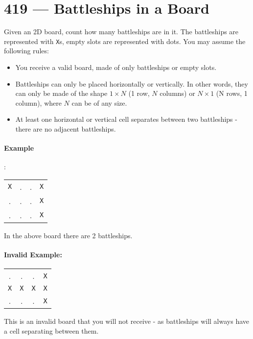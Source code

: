 \section{419 --- Battleships in a Board}
Given an 2D board, count how many battleships are in it. The battleships are represented with \texttt{X}s, empty slots are represented with dots. You may assume the following rules:

\begin{itemize}
\item You receive a valid board, made of only battleships or empty slots.
\item Battleships can only be placed horizontally or vertically. In other words, they can only be made of the shape $1\times N$ (1 row, $N$ columns) or $N\times 1$ (N rows, 1 column), where $N$ can be of any size.
\item At least one horizontal or vertical cell separates between two battleships - there are no adjacent battleships.
\end{itemize}

\paragraph{Example}:
\begin{flushleft}
\begin{table}[H]
\begin{tabular}{cccc}
\texttt{X} & . & . & \texttt{X}\\
. & . & . & \texttt{X}\\
. & . & . & \texttt{X}
\end{tabular}
\end{table}
In the above board there are 2 battleships.
\end{flushleft}

\paragraph{Invalid Example:}

\begin{flushleft}
\begin{table}[H]
\begin{tabular}{cccc}
. & . & . & \texttt{X}\\
\texttt{X} & \texttt{X} & \texttt{X} & \texttt{X}\\
. & . & . & \texttt{X}
\end{tabular}
\end{table}
This is an invalid board that you will not receive - as battleships will always have a cell separating between them.
\end{flushleft}


